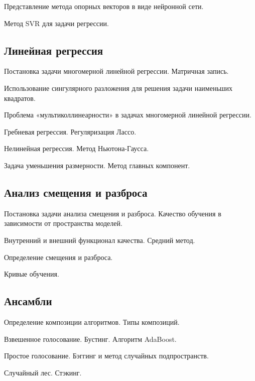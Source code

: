 \documentclass[a4paper,12pt]{article}
\begin{document}
  \myparagraph Представление метода опорных векторов в виде нейронной сети.
  
  \myparagraph Метод SVR для задачи регрессии.
      
  \subsection*{Линейная регрессия}
  
  \myparagraph Постановка задачи многомерной линейной регрессии. Матричная запись.
  
  \myparagraph Использование сингулярного разложения для решения задачи наименьших квадратов.

  \myparagraph Проблема «мультиколлинеарности» в задачах многомерной линейной регрессии. 
  
  \myparagraph Гребневая регрессия. Регуляризация Лассо.
  
  \myparagraph Нелинейная регрессия. Метод Ньютона-Гаусса.
  
  \myparagraph Задача уменьшения размерности. Метод главных компонент. 
  
  \subsection*{Анализ смещения и разброса}
  
  \myparagraph Постановка задачи анализа смещения и разброса. Качество обучения в зависимости от пространства моделей.
  
  \myparagraph Внутренний и внешний функционал качества. Средний метод.
  
  \myparagraph Определение смещения и разброса.
  
  \myparagraph Кривые обучения.
  
  \subsection*{Ансамбли}
  
  \myparagraph Определение композиции алгоритмов. Типы композиций.
  
  \myparagraph Взвешенное голосование. Бустинг. Алгоритм AdaBoost. 
  
  \myparagraph Простое голосование. Бэггинг и метод случайных подпространств.
  
  \myparagraph Случайный лес. Стэкинг.  
  
\end{document}

